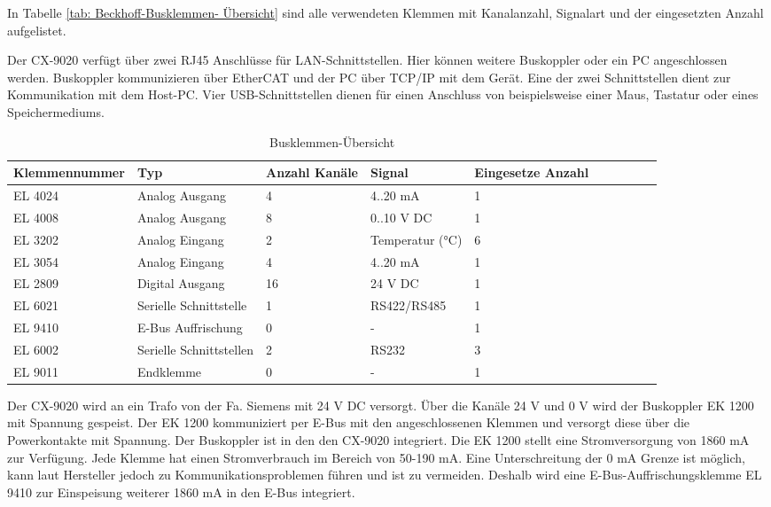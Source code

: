 In Tabelle \ref{tab: Beckhoff-Busklemmen- Übersicht} sind alle verwendeten Klemmen mit Kanalanzahl, Signalart und der eingesetzten Anzahl aufgelistet. 

Der CX-9020 verfügt über zwei RJ45 Anschlüsse für LAN-Schnittstellen. Hier können weitere Buskoppler oder ein PC angeschlossen werden. Buskoppler kommunizieren über EtherCAT  und der PC über TCP/IP mit dem Gerät. Eine der zwei Schnittstellen dient zur Kommunikation mit dem Host-PC. Vier USB-Schnittstellen dienen für einen Anschluss von beispielsweise einer Maus, Tastatur  oder eines Speichermediums. 

\begin{table}[htb]
\centering
\caption{Busklemmen-Übersicht}\vspace{6pt}
\begin{tabular}{p{2cm}p{3.6cm}p{1.4cm}p{2.8cm}p{3.2cm}ccccc}
\hline 
\rule[-1ex]{0pt}{2.5ex} \textbf{Klemmennummer} & \textbf{Typ} & \textbf{Anzahl Kanäle} & \textbf{Signal} & \textbf{Eingesetze Anzahl} \\ 
\hline 
\hline 
\rule[-1ex]{0pt}{2.5ex} EL 4024 & Analog Ausgang & 4 & 4..20 mA & 1 \\ 
\hline 
\rule[-1ex]{0pt}{2.5ex} EL 4008 & Analog Ausgang & 8 & 0..10 V DC & 1 \\ 
\hline 
\rule[-1ex]{0pt}{2.5ex} EL 3202 & Analog Eingang & 2 & Temperatur (°C) & 6 \\ 
\hline 
\rule[-1ex]{0pt}{2.5ex} EL 3054 & Analog Eingang & 4 & 4..20 mA & 1 \\ 
\hline 
\rule[-1ex]{0pt}{2.5ex} EL 2809 & Digital Ausgang & 16 & 24 V DC  & 1 \\ 
\hline 
\rule[-1ex]{0pt}{2.5ex} EL 6021 & Serielle Schnittstelle & 1 &  RS422/RS485 & 1 \\ 
\hline 
\rule[-1ex]{0pt}{2.5ex} EL 9410 & E-Bus Auffrischung & 0 & - & 1 \\ 
\hline 
\rule[-1ex]{0pt}{2.5ex} EL 6002 & Serielle Schnittstellen & 2 & RS232 & 3 \\ 
\hline 
\rule[-1ex]{0pt}{2.5ex} EL 9011 & Endklemme & 0 & - & 1 \\ 
\hline 
\hline 
\end{tabular} 
\label{tab:Klemmenübersicht}
\end{table}



Der CX-9020 wird an ein Trafo von der Fa. Siemens mit 24 V DC versorgt. Über die Kanäle 24 V und 0 V wird der Buskoppler EK 1200 mit Spannung gespeist. Der EK 1200 kommuniziert per E-Bus mit den angeschlossenen Klemmen und versorgt diese über die Powerkontakte mit Spannung.  Der Buskoppler ist in den den CX-9020 integriert. Die EK 1200 stellt eine Stromversorgung von 1860 mA zur Verfügung.  Jede Klemme hat einen Stromverbrauch im Bereich von 50-190 mA. Eine Unterschreitung der 0 mA Grenze ist möglich, kann laut Hersteller jedoch zu Kommunikationsproblemen führen und ist zu vermeiden. Deshalb wird eine E-Bus-Auffrischungsklemme EL 9410 zur Einspeisung weiterer 1860 mA in den E-Bus integriert. 

